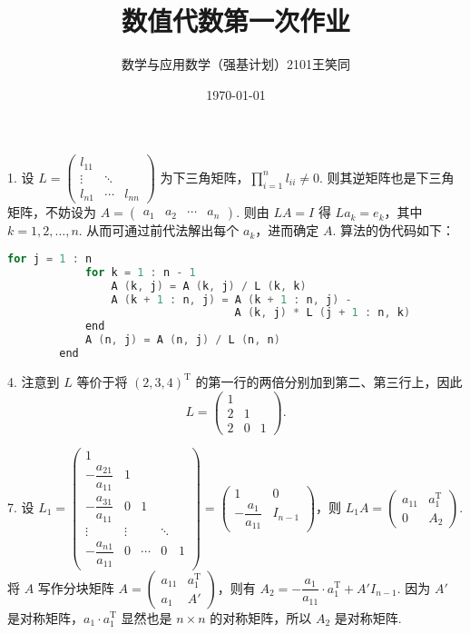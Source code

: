 \documentclass[UTF8]{ctexart}
\title{\vspace{-2cm}数值代数第一次作业}
\author{数学与应用数学（强基计划）2101\quad 王笑同\quad 3210105450}
\date{\today}
\begin{document}
\maketitle

\pagestyle{plain}

1. 设 $L=\begin{pmatrix}
    l_{11}\\
    \vdots&\ddots\\
    l_{n1}&\cdots&l_{nn}
\end{pmatrix}$ 为下三角矩阵，$\displaystyle\prod_{i=1}^n l_{ii}\neq 0$. 则其逆矩阵也是下三角矩阵，不妨设为 $A=\begin{pmatrix}
    a_{1}&a_2&\cdots&a_n
\end{pmatrix}$. 则由 $LA=I$ 得 $La_k=e_k$，其中 $k=1,2,\dots,n$. 从而可通过前代法解出每个 $a_k$，进而确定 $A$. 算法的伪代码如下：

\begin{framed}
    \begin{lstlisting}[language=C]
        for j = 1 : n
            for k = 1 : n - 1
                A (k, j) = A (k, j) / L (k, k)
                A (k + 1 : n, j) = A (k + 1 : n, j) - 
                                   A (k, j) * L (j + 1 : n, k)
            end
            A (n, j) = A (n, j) / L (n, n)
        end
    \end{lstlisting}
\end{framed}

4. 注意到 $L$ 等价于将 $(2,3,4)^{\mathrm{T}}$ 的第一行的两倍分别加到第二、第三行上，因此
\[L=\begin{pmatrix}
    1\\
    2&1\\
    2&0&1
\end{pmatrix}.\]

7. 设 $L_1=\begin{pmatrix}
    1\\
    -\dfrac{a_{21}}{a_{11}}&1\\
    -\dfrac{a_{31}}{a_{11}}&0&1\\
    \vdots&\vdots&&\ddots\\
    -\dfrac{a_{n1}}{a_{11}}&0&\cdots&0&1
\end{pmatrix}=\begin{pmatrix}
    1&0\\
    -\dfrac{a_1}{a_{11}}&I_{n-1}
\end{pmatrix}$，则 $L_1A=\begin{pmatrix}
    a_{11}&a_1^{\mathrm{T}}\\
    0&A_2
\end{pmatrix}$. 将 $A$ 写作分块矩阵 $A=\begin{pmatrix}
    a_{11}&a_1^\mathrm{T}\\
    a_{1}&A'
\end{pmatrix}$，则有 $A_2=-\dfrac{a_1}{a_{11}}\cdot a_1^{\mathrm{T}}+A'I_{n-1}$. 因为 $A'$ 是对称矩阵，$a_1\cdot a_1^{\mathrm{T}}$ 显然也是 $n\times n$ 的对称矩阵，所以 $A_2$ 是对称矩阵.
\end{document}
